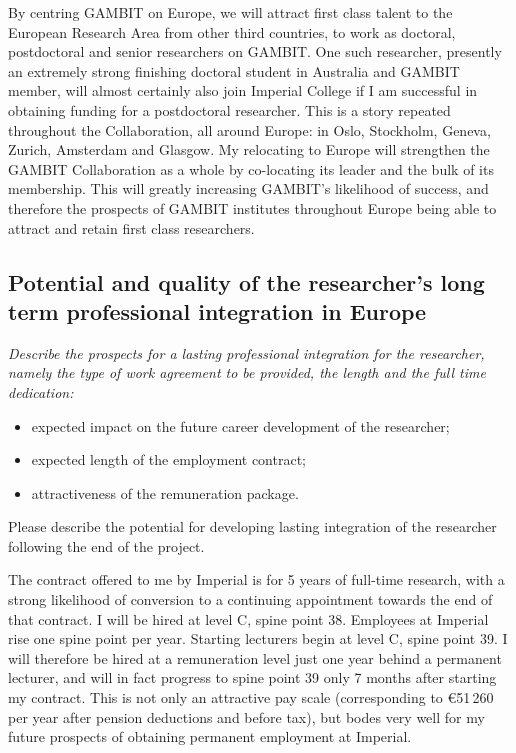 \documentclass[a4paper,11pt]{article}
\newenvironment{xcomment}{\em}{}
\begin{document}
By centring GAMBIT on Europe, we will attract first class talent to the European Research Area from other third countries, to work as doctoral, postdoctoral and senior researchers on GAMBIT.  One such researcher, presently an extremely strong finishing doctoral student in Australia and GAMBIT member, will almost certainly also join Imperial College if I am successful in obtaining funding for a postdoctoral researcher.  This is a story repeated throughout the Collaboration, all around Europe: in Oslo, Stockholm, Geneva, Zurich, Amsterdam and Glasgow.  My relocating to Europe will strengthen the GAMBIT Collaboration as a whole by co-locating its leader and the bulk of its membership.  This will greatly increasing GAMBIT's likelihood of success, and therefore the prospects of GAMBIT institutes throughout Europe being able to attract and retain first class researchers.

\subsection{Potential and quality of the researcher's long term professional integration in Europe}
\begin{xcomment}
Describe the prospects for a lasting professional integration for the
researcher, namely the type of work agreement to be provided, the
length and the full time dedication:

\begin{itemize}
\item expected impact on the future career development of the researcher;
\item expected length of the employment contract;
\item attractiveness of the remuneration package.
\end{itemize}

Please describe the potential for developing lasting integration of
the researcher following the end of the project.
\end{xcomment}

The contract offered to me by Imperial is for 5 years of full-time research, with a strong likelihood of conversion to a continuing appointment towards the end of that contract.  I will be hired at level C, spine point 38.  Employees at Imperial rise one spine point per year.  Starting lecturers begin at level C, spine point 39.  I will therefore be hired at a remuneration level just one year behind a permanent lecturer, and will in fact progress to spine point 39 only 7 months after starting my contract.  This is not only an attractive pay scale (corresponding to \euro51\,260 per year after pension deductions and before tax), but bodes very well for my future prospects of obtaining permanent employment at Imperial.
\end{document}

